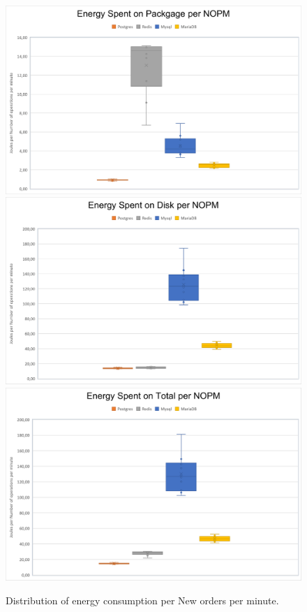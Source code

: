 \begin{figure}[h!]
\centering
\caption{Distribution of energy consumption per New orders per minute.}
\includegraphics[width=0.6\columnwidth]{results/boxplot/Packgage-nopm.png}
\includegraphics[width=0.6\columnwidth]{results/boxplot/Disk-nopm.png}
\includegraphics[width=0.6\columnwidth]{results/boxplot/Total-nopm.png}
\label{fig:bocplotnumber}	
\end{figure}


